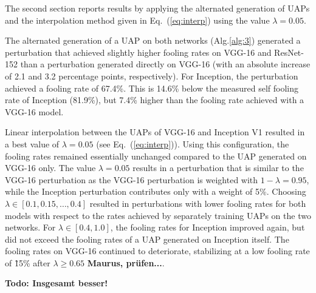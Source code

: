 \documentclass[runningheads]{llncs}
\begin{document}
The second section reports results by applying the alternated generation of UAPs and the interpolation method given in Eq.~(\ref{eq:interp}) using the value $\lambda=0.05$. 

The alternated generation of a UAP on both networks (Alg.\ref{alg:3}) generated a perturbation that achieved slightly higher fooling rates on VGG-16 and ResNet-152 than a perturbation generated directly on VGG-16 (with an absolute increase of 2.1 and 3.2 percentage points, respectively). For Inception, the perturbation achieved a fooling rate of 67.4\%. This is 14.6\% below the measured self fooling rate of Inception (81.9\%), but 7.4\% higher than the fooling rate achieved with a VGG-16 model. 


Linear interpolation between the UAPs of VGG-16 and Inception V1 resulted in a best value of \(\lambda=0.05\) (see Eq.~(\ref{eq:interp})). Using this configuration, the fooling rates remained essentially unchanged compared to the UAP generated on VGG-16 only.
The value \(\lambda=0.05\) results in a perturbation that is similar to the VGG-16 perturbation as the VGG-16 perturbation is weighted with \(1-\lambda=0.95\), while the Inception perturbation contributes only with a weight of 5\%. Choosing \(\lambda\in\left[0.1,0.15,\ldots,0.4\right]\) resulted in perturbations with lower fooling rates for both models with respect to the rates achieved by separately training UAPs on the two networks. For \(\lambda \in\left[0.4,1.0\right]\), the fooling rates for Inception improved again, but did not exceed the fooling rates of a UAP generated on Inception itself. The fooling rates on VGG-16 continued to deteriorate, stabilizing at a low fooling rate of \~15\% after \(\lambda\geq 0.65\) {\bf Maurus, prüfen...}. 

{\bf Todo: Insgesamt besser!}
\end{document}
